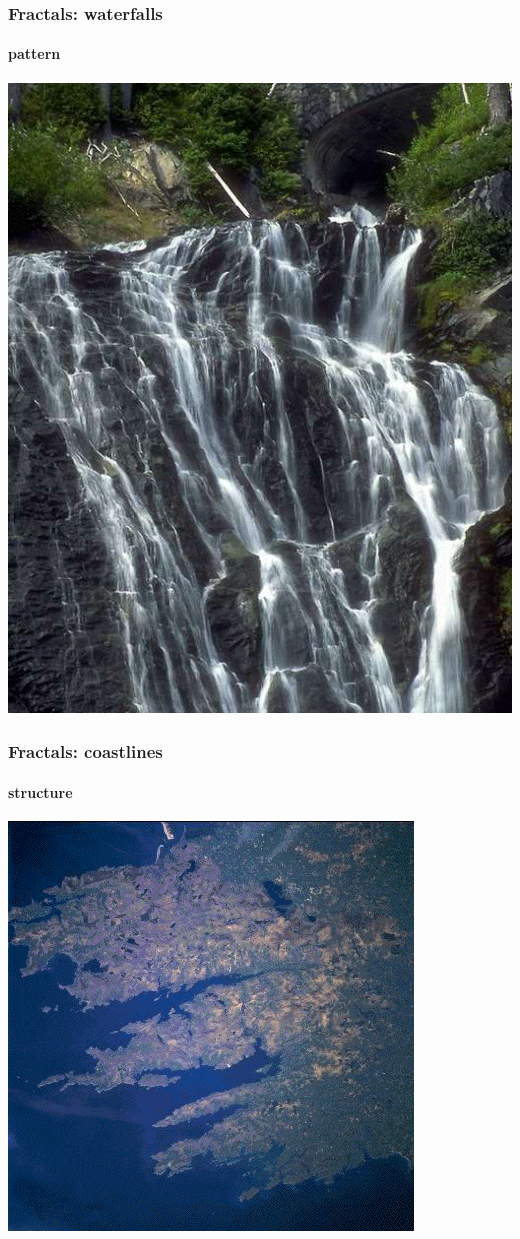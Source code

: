 \documentclass[10pt]{beamer}
\begin{document}
\begin{frame}
\frametitle{Fractals: waterfalls}
\framesubtitle{pattern}
\begin{center}
\includegraphics[height=0.9\textheight]{figs/fractal18}
\end{center}
\end{frame}
\begin{frame}
\frametitle{Fractals: coastlines}
\framesubtitle{structure}
\begin{center}
\includegraphics[height=0.9\textheight]{figs/fractal20}
\end{center}
\end{frame}
\end{document}
